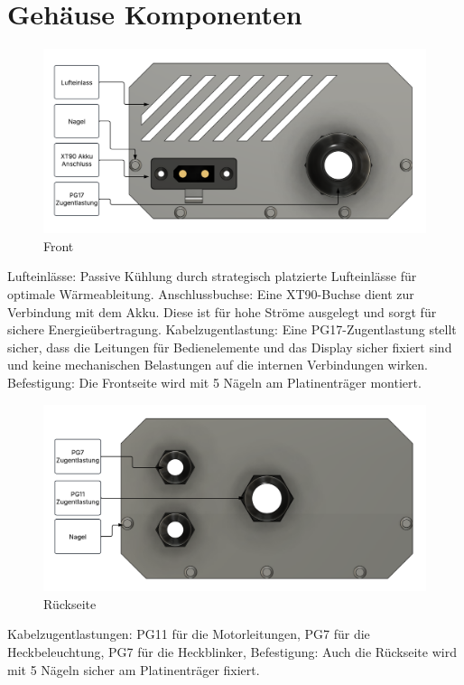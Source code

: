 \documentclass[paper=a4,11pt]{scrreprt}
\begin{document}
\section{Gehäuse Komponenten}
\begin{figure}[ht]
\begin{center}
\includegraphics[width=12cm]{Bilder/FrontA.PNG}
\caption{Front}
\label{Front}
\end{center}
\end{figure}
Lufteinlässe: Passive Kühlung durch strategisch platzierte Lufteinlässe für optimale Wärmeableitung.
Anschlussbuchse: Eine XT90-Buchse dient zur Verbindung mit dem Akku. Diese ist für hohe Ströme ausgelegt und sorgt für sichere Energieübertragung.
Kabelzugentlastung: Eine PG17-Zugentlastung stellt sicher, dass die Leitungen für Bedienelemente und das Display sicher fixiert sind und keine mechanischen Belastungen auf die internen Verbindungen wirken.
Befestigung: Die Frontseite wird mit 5 Nägeln am Platinenträger montiert.
\newpage
\begin{figure}[ht]
\begin{center}
\includegraphics[width=12cm]{Bilder/BackA.PNG}
\caption{Rückseite}
\label{back}
\end{center}
\end{figure}
Kabelzugentlastungen:
PG11 für die Motorleitungen,
PG7 für die Heckbeleuchtung,
PG7 für die Heckblinker,
Befestigung: Auch die Rückseite wird mit 5 Nägeln sicher am Platinenträger fixiert.
\end{document}
